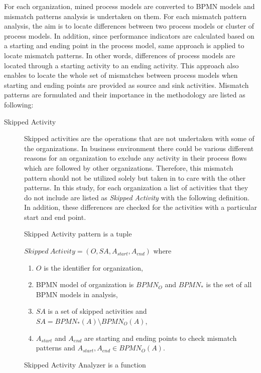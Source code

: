 For each organization, mined process models are converted to BPMN models and mismatch patterns analysis is undertaken on them. For each mismatch pattern analysis, the aim is to locate differences between two process models or cluster of process models. In addition, since performance indicators are calculated based on a starting and ending point in the process model, same approach is applied to locate mismatch patterns. In other words, differences of process models are located through a starting activity to an ending activity. This approach also enables to locate the whole set of mismatches between process models when starting and ending points are provided as source and sink activities. Mismatch patterns are formulated and their importance in the methodology are listed as following:
\begin{description}
  \item[Skipped Activity] Skipped activities are the operations that are not undertaken with some of the organizations. In business environment there could be various different reasons for an organization to exclude any activity in their process flows which are followed by other organizations. Therefore, this mismatch pattern should not be utilized solely but taken in to care with the other patterns. In this study, for each organization a list of activities that they do not include are listed as \textit{Skipped Activity} with the following definition. In addition, these differences are checked for the activities with a particular start and end point. 
		\theoremstyle{definition}
		\begin{definition}
		Skipped Activity pattern is a tuple 

		${Skipped\ Activity} = (O, SA, A_{start}, A_{end}) $ where 
		\begin{enumerate}
		  \item $O$ is the identifier for organization,
		  \item BPMN model of organization is $BPMN_{O}$ and $BPMN_{*}$ is the set of all BPMN models in analysis,
		  \item $SA$ is a set of skipped activities and $SA =  BPMN_{*}(A) \setminus BPMN_{O}(A)$,
		  \item $A_{start}$ and $A_{end}$ are starting and ending points to check mismatch patterns and $A_{start}, A_{end} \in BPMN_{O}(A)$.
		\end{enumerate}
		\end{definition}

		\theoremstyle{definition}
		\begin{definition}
		Skipped Activity Analyzer is a function 


\end{definition}
\end{description}
